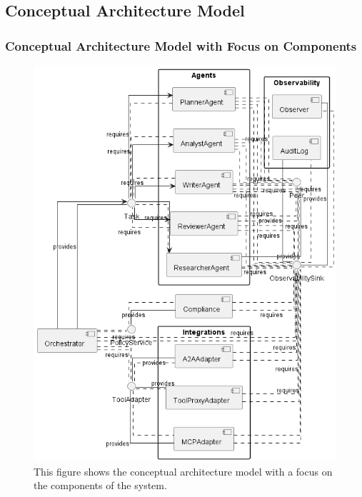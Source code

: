 \clearpage
\subsection*{Conceptual Architecture Model}\label{app:arch-mod}
\subsubsection*{Conceptual Architecture Model with Focus on Components }
\begin{figure}[htbp]
  \centering
  \includegraphics[width=0.8\linewidth]{ressources/MAS/diagrams/MAS_architecture_complete_appendix.png}
  \caption{This figure shows the conceptual architecture model with a focus on the components of the system.}
  \label{fig:app-mas-arch-mod}
\end{figure}

\clearpage
